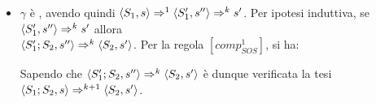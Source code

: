 {\begin{itemize}
\item $\gamma$ è , avendo
  quindi $\confSs{S_1}{s} \Rar{1} \confSs{S_1'}{s''} \Rar{k} s'$. Per ipotesi
  induttiva, se $\confSs{S_1'}{s''} \Rar{k} s'$ allora \\
  $\confSs{S_1'; S_2}{s''} \Rar{k} \confSs{S_2}{s'}$. Per la regola
  $[comp^1_{SOS}]$, si ha:

\begin{prooftree}
\end{prooftree}

  Sapendo che $\confSs{S_1'; S_2}{s''} \Rar{k} \confSs{S_2}{s'}$ è dunque
  verificata la tesi $\confSs{S_1; S_2}{s} \Rar{k+1} \confSs{S_2}{s'}$.
\end{itemize}
}
